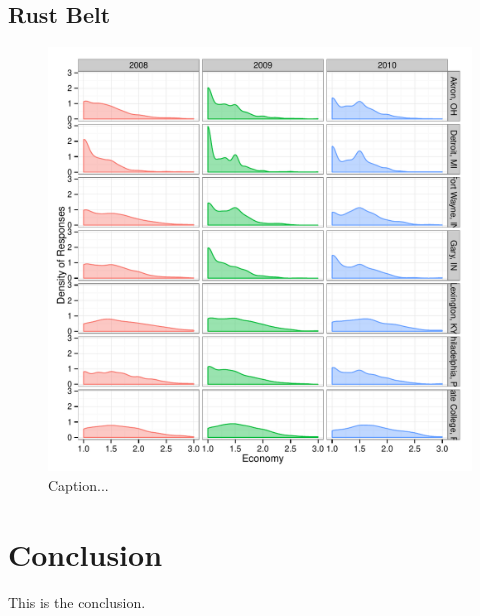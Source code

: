 \documentclass[11pt]{article}\usepackage{knitr}
\begin{document}
\subsection*{Rust Belt}
\begin{knitrout}
\color{fgcolor}\begin{figure}[H]

\includegraphics[width=\maxwidth]{figure/rb_one} \caption[Caption]{Caption...\label{fig:rb_one}}
\end{figure}


\end{knitrout}



\section*{Conclusion}

This is the conclusion.


\printbibliography
\end{document}
